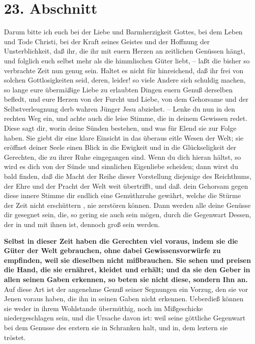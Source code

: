 \section{23. Abschnitt} \label{kap4_ab23}

Darum bitte ich euch bei der Liebe und Barmherzigkeit Gottes, bei dem Leben und
Tode Christi, bei der Kraft seines Geistes und der Hoffnung der Unsterblichkeit,
daß ihr, die ihr mit euern Herzen an zeitlichen Genüssen hängt, und folglich
euch selbst mehr als die himmlischen Güter liebt, -- laßt die bisher so
verbrachte Zeit nun genug sein. Haltet es nicht für hinreichend, daß ihr frei
von solchen Gottlosigkeiten seid, deren, leider! so viele Andere sich schuldig
machen, so lange eure übermäßige Liebe zu erlaubten Dingen euern Genuß derselben
befledt, und eure Herzen von der Furcht und Liebe, von dem Gehorsame und der
Selbstverleugnung derb wahren Jünger Jesu abziehet. -- Lenke du nun in den
rechten Weg ein, und achte auch die leise Stimme, die in deinem Gewissen redet.
Diese sagt dir, worin deine Sünden bestehen, und was für Elend sie zur Folge
haben. Sie giebt dir eine klare Einsicht in das überaus eitle Wesen der Welt;
sie eröffnet deiner Seele einen Blick in die Ewigkeit und in die Glückseligkeit
der Gerechten, die zu ihrer Ruhe eingegangen sind. Wenn du dich hieran hältst,
so wird es dich von der Sünde und sinnlichen Eigenliebe scheiden; dann wirst du
bald finden, daß die Macht der Reihe dieser Vorstellung diejenige des
Reichthums, der Ehre und der Pracht der Welt weit übertrifft, und daß. dein
Gehorsam gegen diese innere Stimme dir endlich eine Gemüthzruhe gewährt, welche
die Stürme der Zeit nicht erschüttern , nie zerstören können. Dann werden alle
deine Genüsse dir gesegnet sein, die, so gering sie auch sein mögen, durch die
Gegenwart Dessen, der in und mit ihnen ist, dennoch groß sein werden.

\medskip

\textbf{Selbst in dieser Zeit haben die Gerechten viel voraus, indem sie die Güter der
Welt gebrauchen, ohne dabei Gewissensvorwürfe zu empfinden, weil sie dieselben
nicht mißbrauchen. Sie sehen und preisen die Hand, die sie ernähret, kleidet und
erhält; und da sie den Geber in allen seinen Gaben erkennen, so beten sie nicht
diese, sondern Ihn an.} Auf diese Art ist der angenehme Genuß seiner Segnungen
ein Vorzug, den sie vor Jenen voraus haben, die ihn in seinen Gaben nicht
erkennen. Ueberdieß können sie weder in ihrem Wohlstande übermüthig, noch im
Mißgeschicke niedergeschlagen sein, und die Ursache davon ist: weil seine
göttliche Gegenwart bei dem Genusse des erstern sie in Schranken halt, und in,
dem leztern sie tröstet.

